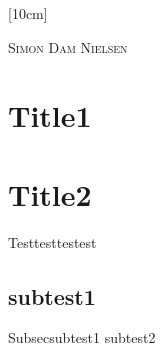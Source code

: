 \documentclass{article}
\begin{document}
\begin{titlepage}
  \begin{center}
  
  \end{center}
  [10cm]
  \begin{flushright}
  
  \textsc{\large Simon Dam Nielsen \\}
  \end{flushright}
\end{titlepage}

\tableofcontents


\section{Title1}\label{sec:intro}
\lipsum[1]

\section{Title2}
Testtesttestest
\lipsum[1]
\subsection{subtest1}
Subsec{subtest1}
subtest2
\lipsum[1]
\end{document}
